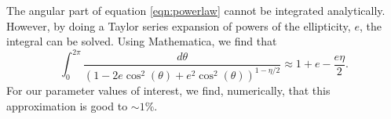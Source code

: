 The angular part of equation \ref{eqn:powerlaw} cannot be integrated analytically. However, by doing a Taylor series expansion of powers of the ellipticity, $e$, the integral can be solved. Using Mathematica, we find that 
\begin{equation}
\int_0^{2 \pi} \frac{d \theta}{ (1 - 2 e \cos^2(\theta) + e^2\cos^2(\theta))^{1 - \eta / 2}} \approx 1 + e  - \frac{ e \eta}{2}.
\end{equation}
For our parameter values of interest, we find, numerically, that this approximation is good to $\sim1\%$. 
